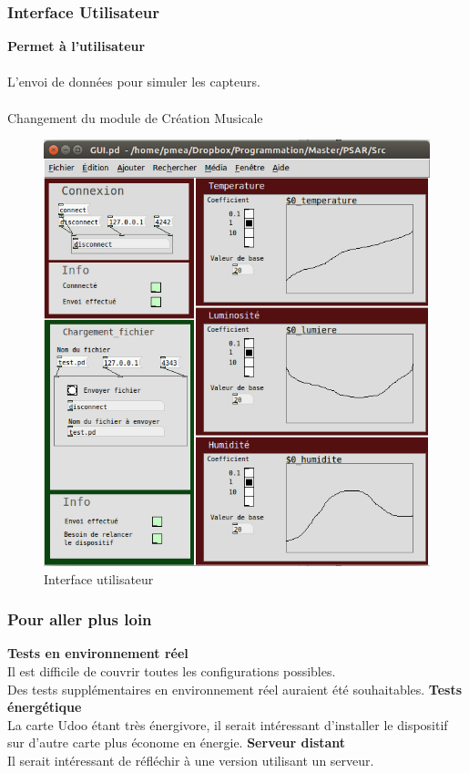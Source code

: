 \documentclass{beamer}
\begin{document}
\begin{frame}
\frametitle{Interface Utilisateur}
\begin{minipage}{0.49\textwidth}
\textbf{Permet à l'utilisateur}\\\\
L'envoi de données pour simuler les capteurs.\\\\
Changement du module de Création Musicale
\end{minipage}
\begin{minipage}{0.49\textwidth}
\begin{figure}
  \centering
  \includegraphics[width=\textwidth]{GUI.jpg} 
	\caption{Interface utilisateur}
\end{figure}
\end{minipage}
\end{frame}


\begin{frame}
\frametitle{Pour aller plus loin}
\textbf{Tests en environnement réel}\\
Il est difficile de couvrir toutes les configurations possibles.\\
Des tests supplémentaires en environnement réel auraient été souhaitables.
\newline
\newline
\textbf{Tests énergétique}\\
La carte Udoo étant très énergivore, il serait intéressant d'installer le dispositif sur d'autre carte plus économe en énergie.
\newline
\newline
\textbf{Serveur distant}\\
Il serait intéressant de réfléchir à une version utilisant un serveur.
\end{frame}
\end{document}
